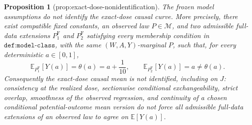 \documentclass{article}
\newtheorem{proposition}{Proposition}
\begin{document}
\begin{proposition}[prop:exact-dose-nonidentification]\label{prop:exact-dose-nonidentification}
The frozen model assumptions do not identify the exact-dose causal curve.  More precisely, there exist compatible fixed constants, an observed law \(P\in\mathcal M\), and two admissible full-data extensions \(P^{\mathrm F}_1\) and \(P^{\mathrm F}_2\) satisfying every membership condition in \(\texttt{def:model-class}\), with the same \((W,A,Y)\)-marginal \(P\), such that, for every deterministic \(a\in[0,1]\),
\[
 \mathbb E_{P^{\mathrm F}_1}[Y(a)]=\theta(a)=a+\frac{1}{10},
 \qquad
 \mathbb E_{P^{\mathrm F}_2}[Y(a)]=a\ne\theta(a).
\]
Consequently the exact-dose causal mean is not identified, including on \(J\): consistency at the realized dose, sectionwise conditional exchangeability, strict overlap, smoothness of the observed regression, and continuity of a chosen conditional potential-outcome mean version do not force all admissible full-data extensions of an observed law to agree on \(\mathbb E[Y(a)]\).
\end{proposition}
\end{document}
